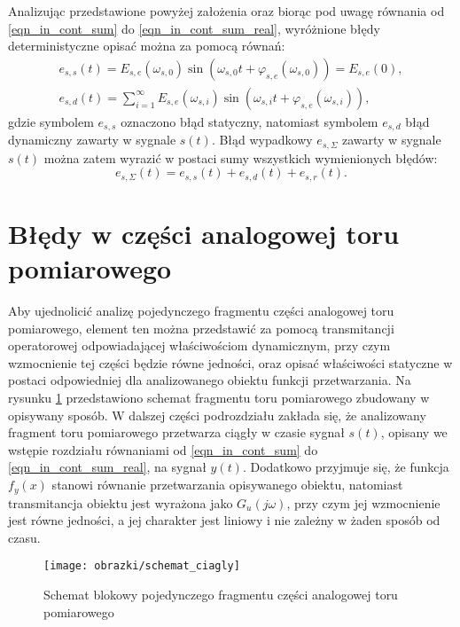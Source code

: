 Analizując przedstawione powyżej założenia oraz biorąc pod uwagę równania od \eqref{eqn_in_cont_sum} do \eqref{eqn_in_cont_sum_real}, wyróżnione błędy deterministyczne opisać można za pomocą równań:
\begin{gather}
e_{s,s}(t) = E_{s,e}(\omega_{s,0}) \sin \left( \omega_{s,0} t + \varphi_{s,e}(\omega_{s,0}) \right) = E_{s,e}(0) \label{eqn_in_cont_err_stat}, \\
e_{s,d}(t) = \sum _{i = 1} ^{\infty} E_{s,e}(\omega_{s,i}) \sin \left( \omega_{s,i} t + \varphi_{s,e}(\omega_{s,i}) \right) \label{eqn_in_cont_err_dyn},
\end{gather}
gdzie symbolem $e_{s,s}$ oznaczono błąd statyczny, natomiast symbolem $e_{s,d}$ błąd dynamiczny zawarty w sygnale $s(t)$. Błąd wypadkowy $e_{s,\Sigma}$ zawarty w sygnale $s(t)$ można zatem wyrazić w postaci sumy wszystkich wymienionych błędów:
\begin{equation}
e_{s,\Sigma}(t) = e_{s,s}(t) + e_{s,d}(t) + e_{s,r}(t) \label{eqn_in_cont_err_sum}.
\end{equation}

\section{Błędy w części analogowej toru pomiarowego}

Aby ujednolicić analizę pojedynczego fragmentu części analogowej toru pomiarowego, element ten można przedstawić za pomocą transmitancji operatorowej odpowiadającej właściwościom dynamicznym, przy czym wzmocnienie tej części będzie równe jedności, oraz opisać właściwości statyczne w postaci odpowiedniej dla analizowanego obiektu funkcji przetwarzania. Na rysunku \ref{fig_chain_cont} przedstawiono schemat fragmentu toru pomiarowego zbudowany w opisywany sposób. W dalszej części podrozdziału zakłada się, że analizowany fragment toru pomiarowego przetwarza ciągły w czasie sygnał $s(t)$, opisany we wstępie rozdziału równaniami od \eqref{eqn_in_cont_sum} do \eqref{eqn_in_cont_sum_real}, na sygnał $y(t)$. Dodatkowo przyjmuje się, że funkcja $f_{y}(x)$ stanowi równanie przetwarzania opisywanego obiektu, natomiast transmitancja obiektu jest wyrażona jako $G_{u}(j\omega)$, przy czym jej wzmocnienie jest równe jedności, a jej charakter jest liniowy i nie zależny w żaden sposób od czasu.

\begin{figure}[htb!]
\begin{center}
\texttt{[image: obrazki/schemat\_ciagly]}
\caption{Schemat blokowy pojedynczego fragmentu części analogowej toru pomiarowego \label{fig_chain_cont}}
\end{center}
\end{figure}

